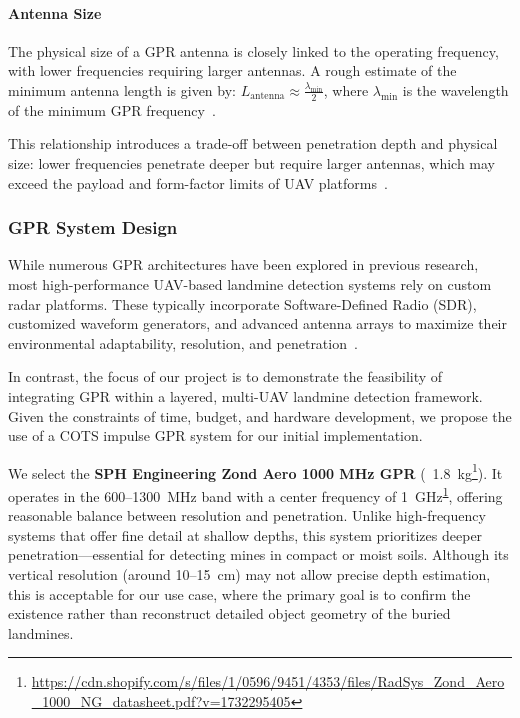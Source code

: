 \paragraph{Antenna Size}

The physical size of a GPR antenna is closely linked to the operating frequency, with lower frequencies requiring larger antennas. A rough estimate of the minimum antenna length is given by: \(L_{\text{antenna}} \approx \frac{\lambda_{\text{min}}}{2}\), where $\lambda_{\text{min}}$ is the wavelength of the minimum GPR frequency~\cite{burr2018design}.

This relationship introduces a trade-off between penetration depth and physical size: lower frequencies penetrate deeper but require larger antennas, which may exceed the payload and form-factor limits of UAV platforms~\cite{alqudsi2021review}.



\subsubsection{GPR System Design}\label{GPR_design}

While numerous GPR architectures have been explored in previous research, most high-performance UAV-based landmine detection systems rely on custom radar platforms. These typically incorporate Software-Defined Radio (SDR), customized waveform generators, and advanced antenna arrays to maximize their environmental adaptability, resolution, and penetration~\cite{cerquera2017uav}.

In contrast, the focus of our project is to demonstrate the feasibility of integrating GPR within a layered, multi-UAV landmine detection framework. Given the constraints of time, budget, and hardware development, we propose the use of a COTS impulse GPR system for our initial implementation.

We select the \textbf{SPH Engineering Zond Aero 1000 MHz GPR} (~1.8~kg\footnote{\label{Zond}\url{https://cdn.shopify.com/s/files/1/0596/9451/4353/files/RadSys_Zond_Aero_1000_NG_datasheet.pdf?v=1732295405}}). It operates in the 600–1300~MHz band with a center frequency of 1~GHz\textsuperscript{\ref{Zond}}, offering reasonable balance between resolution and penetration. Unlike high-frequency systems that offer fine detail at shallow depths, this system prioritizes deeper penetration—essential for detecting mines in compact or moist soils. Although its vertical resolution (around 10--15~cm) may not allow precise depth estimation, this is acceptable for our use case, where the primary goal is to confirm the existence rather than reconstruct detailed object geometry of the buried landmines.

